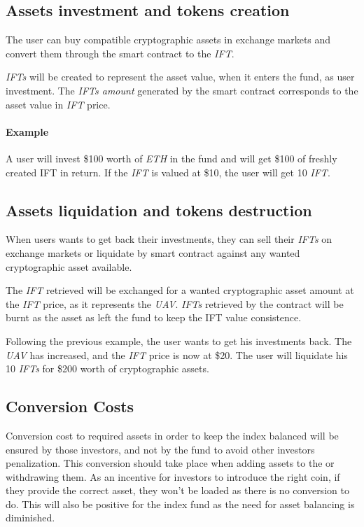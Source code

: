 \documentclass[11pt]{scrartcl}
\begin{document}
    \subsection{Assets investment and tokens creation}
    The user can buy compatible cryptographic assets in exchange markets and
    convert them through the smart contract to the \textit{IFT}.
    
    \textit{IFTs} will be created to represent the asset value,
    when it enters the fund, as user investment. The \textit{IFTs amount} 
    generated by the smart contract corresponds to the asset value in \textit{IFT} 
    price.

    \paragraph{Example}
    A user will invest \$100 worth of \textit{ETH} in the fund
    and will get \$100 of freshly created IFT in return. If the \textit{IFT} is
    valued at \$10, the user will get 10 \textit{IFT}. 
    
    \subsection{Assets liquidation and tokens destruction}
    When users wants to get back their investments, they can sell their \textit{IFTs} 
    on exchange markets or liquidate by smart contract against any wanted cryptographic 
    asset available.

    The \textit{IFT} retrieved will be exchanged for a wanted 
    cryptographic asset amount at the \textit{IFT} price, as it represents the
    \textit{UAV}. \textit{IFTs} retrieved by the contract will be burnt as the
    asset as left the fund to keep the IFT value consistence.

    Following the previous example, the user wants to get his investments back.
    The \textit{UAV} has increased, and the \textit{IFT} price is now at \$20. 
    The user will liquidate his 10 \textit{IFTs} for \$200 worth of cryptographic
    assets.

    \subsection{Conversion Costs}
    Conversion cost to required assets in order to keep the index balanced will 
    be ensured by those investors, and not by the fund to avoid other investors
    penalization. This conversion should take place when adding assets to the
    or withdrawing them. As an incentive for investors to introduce
    the right coin, if they provide the correct asset, they won't be loaded as 
    there is no conversion to do. This will also be positive for the index fund 
    as the need for asset balancing is diminished.
\end{document}
